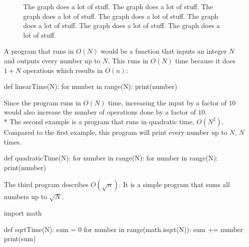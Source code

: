 \documentclass[main.tex]{subfiles}
\begin{document}
\begin{figure}[ht]
  \begin{center}
  \end{center}
  \caption{The graph does a lot of stuff. The graph does a lot of stuff. The
    graph does a lot of stuff. The graph does a lot of stuff. The graph does a
    lot of stuff. The graph does a lot of stuff. The graph does a lot of stuff.}
\end{figure}

\noindent
A program that runs in $O(N)$ would be a function that inputs an integer $N$ and
outputs every number up to $N$. This runs in $O(N)$ time because it does $1+N$
operations which results in $O(n)$:

\begin{python}
  def linearTime(N):
      for number in range(N):
          print(number)
\end{python}
\noindent
Since the program runs in $O(N)$ time, increasing the input by a factor of $10$
would also increase the number of operations done by a factor of $10$. \newline
\\*
The second example is a program that runs in quadratic time, $O(N^{2})$.
Compared to the first example, this program will print every number up to $N$,
$N$ times.

\begin{python}
  def quadraticTime(N):
      for number in range(N):
          for number in range(N):
              print(number)
\end{python}

\vspace{5mm}
\noindent
The third program describes $O(\sqrt{n})$. It is a simple program that sums all
numbers up to $\sqrt{N}$.

\begin{python}
  import math

  def sqrtTime(N):
      sum = 0
      for number in range(math.isqrt(N)):
          sum += number
          print(sum)
\end{python}
\end{document}
